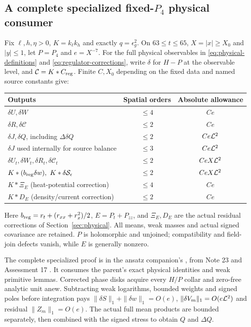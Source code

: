 \subsection{A complete specialized fixed-\texorpdfstring{$P_4$}{P4} physical consumer}
\begin{theorem}
\label{thm:p4-physical}
Fix $\ell,h,\eta>0$, $K=k_\ell k_h$ and exactly
$q=\epsilon_g^2$. On $63\le t\le65$, $X=|x|\ge X_0$ and
$|y|\le1$, let $P=P_4$ and $e=X^{-7}$. For the full physical
observables in \eqref{eq:physical-definitions} and
\eqref{eq:regulator-corrections}, write $\delta$ for $H-P$ at the
observable level, and $\mathcal C=K*C_{\rm reg}$. Finite
$C,X_0$ depending on the fixed data and named source constants give:
\begin{center}\small
\begin{tabular}{p{}cc}
\toprule Outputs & Spatial orders & Absolute allowance\\\midrule
$\delta U,\delta W$ & $\le4$ & $Ce$\\
$\delta R,\delta\mathcal C$ & $\le2$ & $Ce$\\
$\delta J,\delta Q$, including $\Delta\delta Q$ & $\le2$ & $Ce\mathcal L^2$\\
$\delta J$ used internally for source balance & $\le3$ & $Ce\mathcal L^2$\\
$\delta U_t,\delta W_t,\delta R_t,\delta\mathcal C_t$ & $\le2$ & $CeX\mathcal L^2$\\
$K*(b_{\rm reg}\delta w),\ K*\delta\mathcal S_\epsilon$ & $\le2$ & $CeX\mathcal L^2$\\
$K*\Xi_E$ (heat-potential correction) & $\le4$ & $Ce$\\
$K*D_E$ (density/current correction) & $\le2$ & $Ce$\\\bottomrule
\end{tabular}
\end{center}
Here $b_{\rm reg}=r_t+(r_{xx}+r_x^2)/2$,
$E=P_t+P_{zz}$, and $\Xi_E,D_E$ are the actual residual corrections
of Section~\ref{sec:physical}. All means, weak masses and actual signed
covariance are retained. $P$ is holomorphic and unjoined; compatibility
and field-join defects vanish, while $E$ is generally nonzero.
\end{theorem}
The complete specialized proof is in the ansatz companion's
,
from Note 23 and Assessment 17 \cite{p4-physical}. It consumes the
parent's exact physical identities and weak primitive lemmas. Corrected
phase disks acquire every $H/P$ collar and zero-free analytic unit anew.
Subtracting weak logarithms, bounded weights and signed poles before
integration pays $\|\delta S\|_1+\|\delta w\|_1=O(e)$,
$\|\delta V_m\|_1=O(e\mathcal L^2)$ and residual
$\|Z_m\|_1=O(e)$. The actual full mean products are bounded separately,
then combined with the signed stress to obtain $Q$ and $\Delta Q$.

